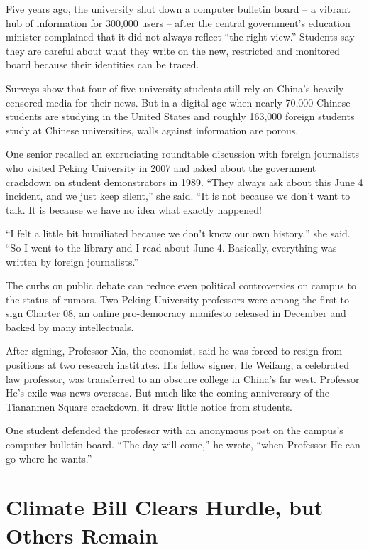 \documentclass[12pt,a4paper,onecolumn]{article}
\begin{document}
Five years ago, the university shut down a computer bulletin board -- a vibrant hub of information
for 300,000 users -- after the central government's education minister complained that it did not
always reflect ``the right view.'' Students say they are careful about what they write on the new,
restricted and monitored board because their identities can be traced.

Surveys show that four of five university students still rely on China's heavily censored media for
their news. But in a digital age when nearly 70,000 Chinese students are studying in the United
States and roughly 163,000 foreign students study at Chinese universities, walls against information
are porous.

One senior recalled an excruciating roundtable discussion with foreign journalists who visited
Peking University in 2007 and asked about the government crackdown on student demonstrators in 1989.
``They always ask about this June 4 incident, and we just keep silent,'' she said. ``It is not
because we don't want to talk. It is because we have no idea what exactly happened!

``I felt a little bit humiliated because we don't know our own history,'' she said. ``So I went to
the library and I read about June 4. Basically, everything was written by foreign journalists.''

The curbs on public debate can reduce even political controversies on campus to the status of
rumors. Two Peking University professors were among the first to sign Charter 08, an online
pro-democracy manifesto released in December and backed by many intellectuals.

After signing, Professor Xia, the economist, said he was forced to resign from positions at two
research institutes. His fellow signer, He Weifang, a celebrated law professor, was transferred to
an obscure college in China's far west. Professor He's exile was news overseas. But much like the
coming anniversary of the Tiananmen Square crackdown, it drew little notice from students.

One student defended the professor with an anonymous post on the campus's computer bulletin board.
``The day will come,'' he wrote, ``when Professor He can go where he wants.''

\section{Climate Bill Clears Hurdle, but Others Remain}
\end{document}
